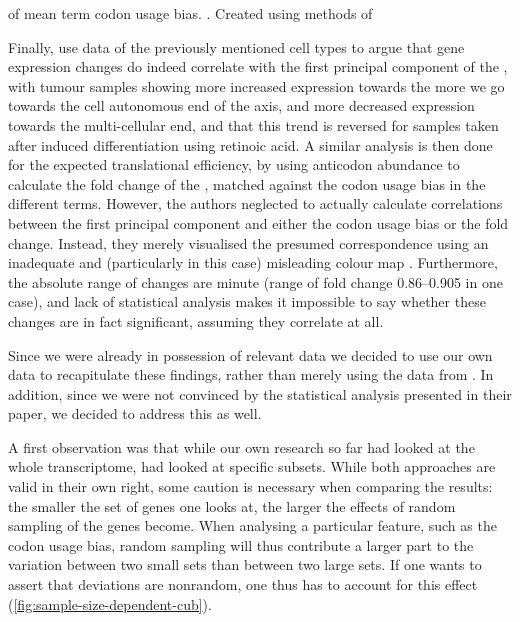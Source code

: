     {\pca of mean \go term codon usage bias.}
    {. Created using methods of \citet{Gingold:2014}}


Finally, \citet{Gingold:2014} use \rnaseq data of the previously mentioned cell
types to argue that gene expression changes do indeed correlate with the first
principal component of the \pca, with tumour samples showing more increased
expression towards the more we go towards the cell autonomous end of the axis,
and more decreased expression towards the multi-cellular end, and that this
trend is reversed for samples taken after induced differentiation using retinoic
acid. A similar analysis is then done for the expected translational efficiency,
by using \trna anticodon abundance to calculate the fold change of the \tai{},
matched against the codon usage bias in the different \go terms. However, the
authors neglected to actually calculate correlations between the first principal
component and either the codon usage bias or the \tai fold change. Instead, they
merely visualised the presumed correspondence using an inadequate and
(particularly in this case) misleading colour map \citep{Borland:2007}.
Furthermore, the absolute range of changes are minute (range of \tai fold change
\numrange{0.86}{0.905} in one case), and lack of statistical analysis makes it
impossible to say whether these changes are in fact significant, assuming they
correlate at all.

Since we were already in possession of relevant \trna data we decided to use our
own data to recapitulate these findings, rather than merely using the data from
\citet{Gingold:2014}. In addition, since we were not convinced by the
statistical analysis presented in their paper, we decided to address this as
well.

A first observation was that while our own research so far had looked at the
whole transcriptome, \citet{Gingold:2014} had looked at specific subsets. While
both approaches are valid in their own right, some caution is necessary when
comparing the results: the smaller the set of genes one looks at, the larger the
effects of random sampling of the genes become. When analysing a particular
feature, such as the codon usage bias, random sampling will thus contribute a
larger part to the variation between two small sets than between two large sets.
If one wants to assert that deviations are nonrandom, one thus has to account
for this effect (\cref{fig:sample-size-dependent-cub}).

